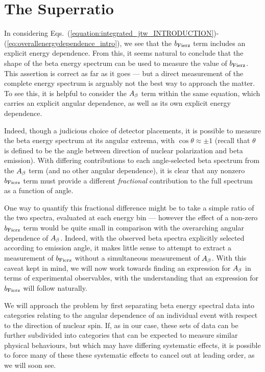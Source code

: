 \section{The Superratio}
\label{signature_chapter}
In considering Eqs.~(\ref{equation:integrated_jtw_INTRODUCTION})-(\ref{eq:overallenergydependence_intro}), we see that the $b_{\mathrm{Fierz}}$ term includes an explicit energy dependence.  From this, it seems natural to conclude that the shape of the beta energy spectrum can be used to measure the value of $b_{\mathrm{Fierz}}$.  This assertion is correct as far as it goes --- but a direct measurement of the complete energy spectrum is arguably not the best way to approach the matter.  To see this, it is helpful to consider the $A_{\beta}$ term within the same equation, which carries an explicit angular dependence, as well as its own explicit energy dependence.  

Indeed, though a judicious choice of detector placements, it is possible to measure the beta energy spectrum at its angular extrema, with $\cos\theta \approx \pm 1$ (recall that $\theta$ is defined to be the angle between direction of nuclear polarization and beta emission).  
With differing contributions to each angle-selected beta spectrum from the $A_{\beta}$ term (and no other angular dependence), it is clear that any nonzero $b_{\mathrm{Fierz}}$ term must provide a different \emph{fractional} contribution to the full spectrum as a function of angle.

One way to quantify this fractional difference might be to take a simple ratio of the two spectra, evaluated at each energy bin --- however the effect of a non-zero $b_{\mathrm{Fierz}}$ term would be quite small in comparison with the overarching angular dependence of $A_{\beta}$.  Indeed, with the observed beta spectra explicitly selected according to emission angle, it makes little sense to attempt to extract a measurement of $b_{\mathrm{Fierz}}$ without a simultaneous measurement of $A_{\beta}$.  With this caveat kept in mind, we will now work towards finding an expression for $A_{\beta}$ in terms of experimental observables, with the understanding that an expression for $b_{\mathrm{Fierz}}$ will follow naturally.  

We will approach the problem by first separating beta energy spectral data into categories relating to the angular dependence of an individual event with respect to the direction of nuclear spin.  %
If, as in our case, these sets of data can be further subdivided into categories that can be expected to measure similar physical behaviours, but which may have differing systematic effects, it is possible to force many of these these systematic effects to cancel out at leading order, as we will soon see.  


